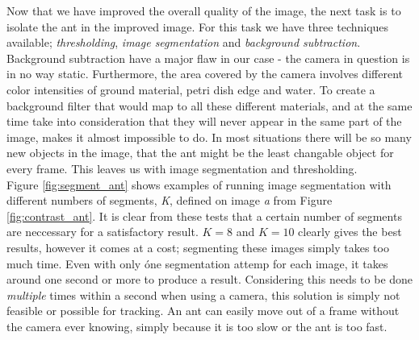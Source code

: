 Now that we have improved the overall quality of the image, the next task is to isolate the ant in the improved image. For this task we have three techniques available; \emph{thresholding}, \emph{image segmentation} and \emph{background subtraction}. Background subtraction have a major flaw in our case - the camera in question is in no way static. Furthermore, the area covered by the camera involves different color intensities of ground material, petri dish edge and water. To create a background filter that would map to all these different materials, and at the same time take into consideration that they will never appear in the same part of the image, makes it almost impossible to do. In most situations there will be so many new objects in the image, that the ant might be the least changable object for every frame. This leaves us with image segmentation and thresholding.\\

Figure \ref{fig:segment_ant} shows examples of running image segmentation with different numbers of segments, \textit{K}, defined on image \emph{a} from Figure \ref{fig:contrast_ant}. It is clear from these tests that a certain number of segments are neccessary for a satisfactory result. $K=8$ and $K=10$ clearly gives the best results, however it comes at a cost; segmenting these images simply takes too much time. Even with only óne segmentation attemp for each image, it takes around one second or more to produce a result. Considering this needs to be done \emph{multiple} times within a second when using a camera, this solution is simply not feasible or possible for tracking. An ant can easily move out of a frame without the camera ever knowing, simply because it is too slow or the ant is too fast.\\

